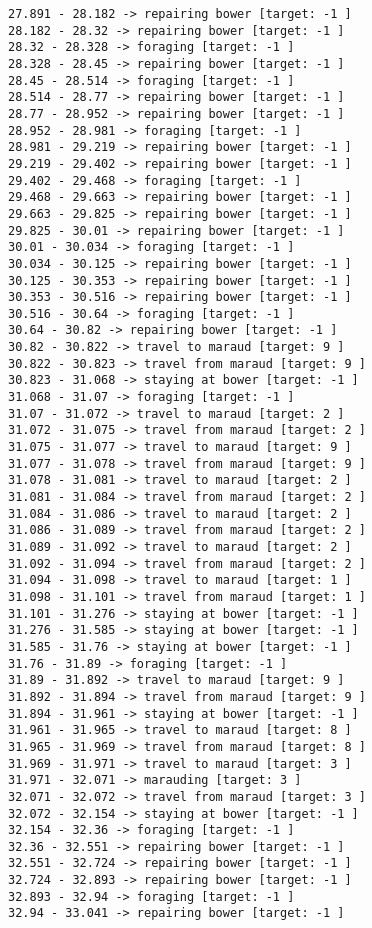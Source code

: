 \documentclass[11pt]{article}
\begin{document}
\begin{Verbatim}[commandchars=\\\{\}]
27.891 - 28.182 -> repairing bower [target: -1 ]
28.182 - 28.32 -> repairing bower [target: -1 ]
28.32 - 28.328 -> foraging [target: -1 ]
28.328 - 28.45 -> repairing bower [target: -1 ]
28.45 - 28.514 -> foraging [target: -1 ]
28.514 - 28.77 -> repairing bower [target: -1 ]
28.77 - 28.952 -> repairing bower [target: -1 ]
28.952 - 28.981 -> foraging [target: -1 ]
28.981 - 29.219 -> repairing bower [target: -1 ]
29.219 - 29.402 -> repairing bower [target: -1 ]
29.402 - 29.468 -> foraging [target: -1 ]
29.468 - 29.663 -> repairing bower [target: -1 ]
29.663 - 29.825 -> repairing bower [target: -1 ]
29.825 - 30.01 -> repairing bower [target: -1 ]
30.01 - 30.034 -> foraging [target: -1 ]
30.034 - 30.125 -> repairing bower [target: -1 ]
30.125 - 30.353 -> repairing bower [target: -1 ]
30.353 - 30.516 -> repairing bower [target: -1 ]
30.516 - 30.64 -> foraging [target: -1 ]
30.64 - 30.82 -> repairing bower [target: -1 ]
30.82 - 30.822 -> travel to maraud [target: 9 ]
30.822 - 30.823 -> travel from maraud [target: 9 ]
30.823 - 31.068 -> staying at bower [target: -1 ]
31.068 - 31.07 -> foraging [target: -1 ]
31.07 - 31.072 -> travel to maraud [target: 2 ]
31.072 - 31.075 -> travel from maraud [target: 2 ]
31.075 - 31.077 -> travel to maraud [target: 9 ]
31.077 - 31.078 -> travel from maraud [target: 9 ]
31.078 - 31.081 -> travel to maraud [target: 2 ]
31.081 - 31.084 -> travel from maraud [target: 2 ]
31.084 - 31.086 -> travel to maraud [target: 2 ]
31.086 - 31.089 -> travel from maraud [target: 2 ]
31.089 - 31.092 -> travel to maraud [target: 2 ]
31.092 - 31.094 -> travel from maraud [target: 2 ]
31.094 - 31.098 -> travel to maraud [target: 1 ]
31.098 - 31.101 -> travel from maraud [target: 1 ]
31.101 - 31.276 -> staying at bower [target: -1 ]
31.276 - 31.585 -> staying at bower [target: -1 ]
31.585 - 31.76 -> staying at bower [target: -1 ]
31.76 - 31.89 -> foraging [target: -1 ]
31.89 - 31.892 -> travel to maraud [target: 9 ]
31.892 - 31.894 -> travel from maraud [target: 9 ]
31.894 - 31.961 -> staying at bower [target: -1 ]
31.961 - 31.965 -> travel to maraud [target: 8 ]
31.965 - 31.969 -> travel from maraud [target: 8 ]
31.969 - 31.971 -> travel to maraud [target: 3 ]
31.971 - 32.071 -> marauding [target: 3 ]
32.071 - 32.072 -> travel from maraud [target: 3 ]
32.072 - 32.154 -> staying at bower [target: -1 ]
32.154 - 32.36 -> foraging [target: -1 ]
32.36 - 32.551 -> repairing bower [target: -1 ]
32.551 - 32.724 -> repairing bower [target: -1 ]
32.724 - 32.893 -> repairing bower [target: -1 ]
32.893 - 32.94 -> foraging [target: -1 ]
32.94 - 33.041 -> repairing bower [target: -1 ]

\end{Verbatim}
\end{document}
